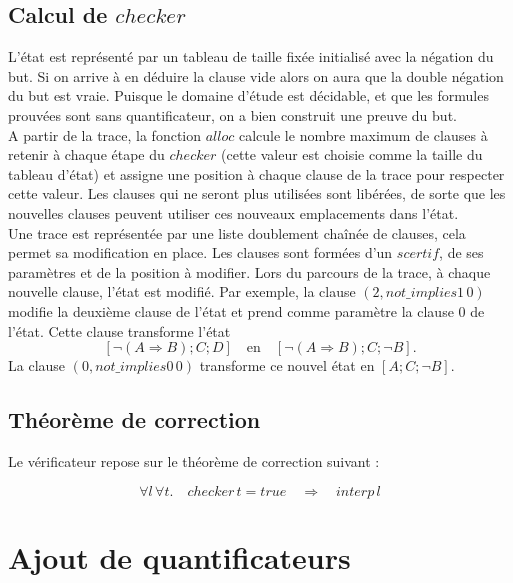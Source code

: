 \documentclass[11pt]{article}
\begin{document}
\subsection{Calcul de $checker$} \label{alloc}
L'état est représenté par un tableau de taille fixée initialisé avec la négation du but. Si on arrive à en déduire la clause vide alors on aura que la double négation du but est vraie. Puisque le domaine d'étude est décidable, et que les formules prouvées sont sans quantificateur, on a bien construit une preuve du but. \\

A partir de la trace, la fonction $alloc$ calcule le nombre maximum de clauses à retenir à chaque étape du $checker$ (cette valeur est choisie comme la taille du tableau d'état) et assigne une position à chaque clause de la trace pour respecter cette valeur. Les clauses qui ne seront plus utilisées sont libérées, de sorte que les nouvelles clauses peuvent utiliser ces nouveaux emplacements dans l'état. \\

Une trace est représentée par une liste doublement chaînée de clauses, cela permet sa modification en place. Les clauses sont formées d'un $scertif$, de ses paramètres et de la position à modifier. Lors du parcours de la trace, à chaque nouvelle clause, l'état est modifié. Par exemple, la clause $(2, not\_implies1 \, 0)$ modifie la deuxième clause de l'état et prend comme paramètre la clause $0$ de l'état. Cette clause transforme l'état 
\[    [\neg (A \Rightarrow B);  C; D] \quad \text{en} \quad [\neg (A \Rightarrow B);  C; \neg B]. \]
La clause $(0, not\_implies0 \, 0)$ transforme ce nouvel état en $[A; C; \neg B]$. \\


\subsection{Théorème de correction}

Le vérificateur repose sur le théorème de correction suivant :

\[ \forall l \, \forall t. \quad checker \, t = true \quad \Rightarrow \quad interp \, l \]







\newpage
\section{Ajout de quantificateurs}
\end{document}
